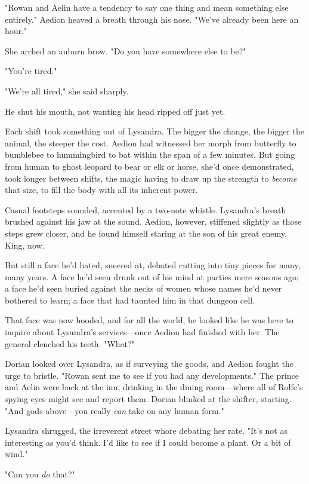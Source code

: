 "Rowan and Aelin have a tendency to say one thing and mean something else entirely." Aedion heaved a breath through his nose. "We've already been here an hour."

She arched an auburn brow. "Do you have somewhere else to be?"

"You're tired."

"We're all tired," she said sharply.

He shut his mouth, not wanting his head ripped off just yet.

Each shift took something out of Lysandra. The bigger the change, the bigger the animal, the steeper the cost. Aedion had witnessed her morph from butterfly to bumblebee to hummingbird to bat within the span of a few minutes. But going from human to ghost leopard to bear or elk or horse, she'd once demonstrated, took longer between shifts, the magic having to draw up the strength to \emph{become} that size, to fill the body with all its inherent power.

Casual footsteps sounded, accented by a two-note whistle. Lysandra's breath brushed against his jaw at the sound. Aedion, however, stiffened slightly as those steps grew closer, and he found himself staring at the son of his great enemy. King, now.

But still a face he'd hated, sneered at, debated cutting into tiny pieces for many, many years. A face he'd seen drunk out of his mind at parties mere seasons ago; a face he'd seen buried against the necks of women whose names he'd never bothered to learn; a face that had taunted him in that dungeon cell.

That face was now hooded, and for all the world, he looked like he was here to inquire about Lysandra's services---once Aedion had finished with her. The general clenched his teeth. "What?"

Dorian looked over Lysandra, as if surveying the goods, and Aedion fought the urge to bristle. "Rowan sent me to see if you had any developments." The prince and Aelin were back at the inn, drinking in the dining room---where all of Rolfe's spying eyes might see and report them. Dorian blinked at the shifter, starting. "And gods above---you really \emph{can} take on any human form."

Lysandra shrugged, the irreverent street whore debating her rate. "It's not as interesting as you'd think. I'd like to see if I could become a plant. Or a bit of wind."

"Can you  \emph{do} that?"

